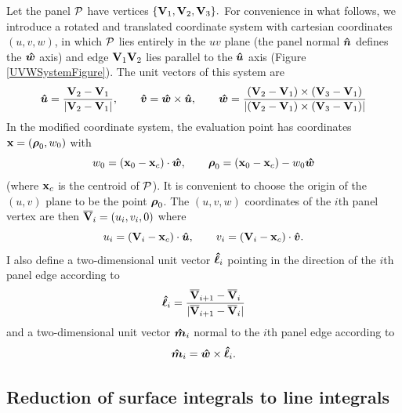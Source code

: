 \documentclass[letterpaper]{article}
\begin{document}
Let the panel $\mathcal{P}$ have vertices
$\{\mathbf{V}_1, \mathbf{V}_2, \mathbf{V}_3\}.$
For convenience in what follows, we introduce a
rotated and translated coordinate system with 
cartesian coordinates
$(u,v,w)$, in which $\mathcal{P}$ lies entirely in the $uv$
plane (the panel normal $\boldsymbol{\hat{n}}$ defines the $\boldsymbol{\hat{w}}$ axis)
and edge $\mathbf{V}_1 \mathbf{V}_2$ lies parallel to the 
$\boldsymbol{\hat{u}}$ axis (Figure \ref{UVWSystemFigure}).
The unit vectors of this system 
are 
$$ \boldsymbol{\hat{u}}=\frac{\mathbf{V}_2 - \mathbf{V}_1}{|\mathbf{V}_2 - \mathbf{V}_1|},
   \qquad
   \boldsymbol{\hat{v}}=\boldsymbol{\hat{w}} \times \boldsymbol{\hat{u}},
   \qquad
   \boldsymbol{\hat{w}}=
    \frac{ (\mathbf{V}_2 - \mathbf{V}_1)\times(\mathbf{V}_3 - \mathbf{V}_1)}
         {|(\mathbf{V}_2 - \mathbf{V}_1)\times(\mathbf{V}_3 - \mathbf{V}_1)|}
$$
In the modified coordinate system, the evaluation point has
coordinates $\mathbf{x} = (\boldsymbol{\rho}_0, w_0)$ with
$$ w_0 = (\mathbf{x}_0 - \mathbf{x}_c) \cdot \boldsymbol{\hat{w}}, 
   \qquad
   \boldsymbol{\rho}_0 = (\mathbf{x}_0 - \mathbf{x}_c) - w_0\boldsymbol{\hat{w}}
$$
(where $\mathbf{x}_c$ is the centroid of $\mathcal{P}$).
It is convenient to choose the origin of the $(u,v)$ plane to be 
the point $\boldsymbol{\rho}_0$. The $(u,v,w)$ coordinates of the $i$th 
panel vertex are then 
$\overline{\mathbf{V}}_i = (u_i, v_i, 0)$ where
$$ u_i=(\mathbf{V}_i-\mathbf{x}_c) \cdot \boldsymbol{\hat{u}}, \qquad 
   v_i=(\mathbf{V}_i-\mathbf{x}_c) \cdot \boldsymbol{\hat{v}}.
$$
I also define a two-dimensional 
unit vector $\boldsymbol{\hat \ell}_i$ pointing in the direction
of the $i$th panel edge according to
$$ \boldsymbol{\hat \ell}_i= \frac{  \overline{\mathbf{V}}_{i+1}-\overline{\mathbf{V}}_{i} }
                         { |\overline{\mathbf{V}}_{i+1}-\overline{\mathbf{V}}_{i}| }
$$
and a two-dimensional unit vector $\boldsymbol{\hat{m}}_i$ normal to the $i$th 
panel edge according to 
$$ \boldsymbol{\hat{m}}_i=\boldsymbol{\hat{w}} \times \boldsymbol{\hat \ell}_i.$$

\subsection{Reduction of surface integrals to line integrals}
\end{document}
